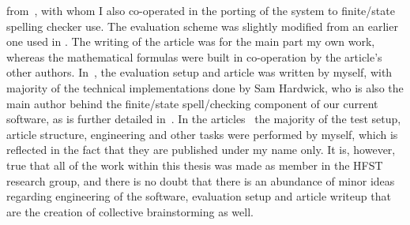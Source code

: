 \documentclass[officiallayout]{unihelcompling}
\begin{document}
from~\citet{silfverberg2010partofspeech}, with whom I also co-operated in the
porting of the system to finite\-/state spelling checker use. The evaluation
scheme was slightly modified from an earlier one used in
. The writing of the article
 was for the main part  my own work, whereas
the mathematical formulas were built in co-operation by the article's other
authors.  In~, the evaluation setup and article
was written by myself, with majority of the technical implementations done by
Sam Hardwick, who is also the main author behind the finite\-/state
spell\-/checking component of our current software, as is further detailed
in~\citet{linden2011hfst}.  In the
articles~ the majority
of the test setup, article structure, engineering and other tasks were
performed by myself, which is reflected in the fact that they are published
under my name only. It is, however, true that all of the work within this
thesis was made as member in the HFST research group, and there is no doubt
that there is an abundance of minor ideas regarding engineering of the
software, evaluation setup and article writeup that are the creation of
collective brainstorming as well.
\end{document}
